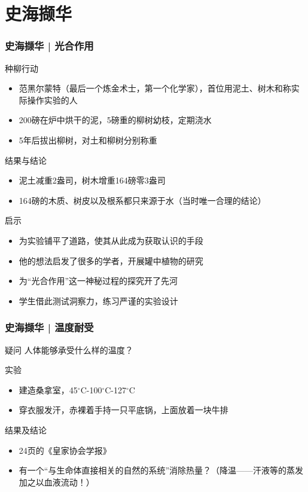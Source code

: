 \section{史海撷华}
\begin{frame}
  \frametitle{史海撷华 | 光合作用}
  \begin{block}{种柳行动}
    \begin{itemize}
      \item 范\textbullet 黑尔蒙特（最后一个炼金术士，第一个化学家），首位用泥土、树木和称实际操作实验的人
      \item 200磅在炉中烘干的泥，5磅重的柳树幼枝，定期浇水
      \item 5年后拔出柳树，对土和柳树分别称重
    \end{itemize}
  \end{block}
  \vspace{-0.75em}
  \pause
  \begin{block}{结果与结论}
    \begin{itemize}
      \item 泥土减重2盎司，树木增重164磅零3盎司
      \item 164磅的木质、树皮以及根系都只来源于水（当时唯一合理的结论）
    \end{itemize}
  \end{block}
  \vspace{-0.75em}
  \pause
  \begin{block}{启示}
    \begin{itemize}
      \item 为实验铺平了道路，使其从此成为获取认识的手段
      \item 他的想法启发了很多的学者，开展罐中植物的研究
      \item 为“光合作用”这一神秘过程的探究开了先河
      \item 学生借此测试洞察力，练习严谨的实验设计
    \end{itemize}
  \end{block}
\end{frame}

\begin{frame}
  \frametitle{史海撷华 | 温度耐受}
  \begin{block}{疑问}
    人体能够承受什么样的温度？
  \end{block}
  \pause
  \begin{block}{实验}
    \begin{itemize}
      \item 建造桑拿室，45$^{\circ}$C-100$^{\circ}$C-127$^{\circ}$C
      \item 穿衣服发汗，赤裸着手持一只平底锅，上面放着一块牛排
    \end{itemize}
  \end{block}
  \pause
  \begin{block}{结果及结论}
    \begin{itemize}
      \item 24页的《皇家协会学报》
      \item 有一个“与生命体直接相关的自然的系统”消除热量？（降温——汗液等的蒸发加之以血液流动！）
    \end{itemize}
  \end{block}
\end{frame}

